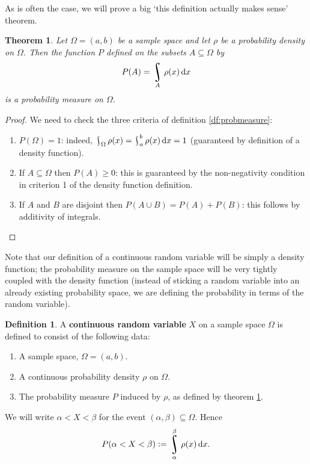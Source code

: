 \documentclass[a4paper,leqno]{article}
\DeclareMathOperator*{\rint}{\scalerel*{\rotatebox{17}{$\!\int\!$}}{\int}}
\numberwithin{equation}{section}
\newtheorem{thm}[equation]{Theorem}
\theoremstyle{definition}
\newtheorem{defn}[equation]{Definition}
\theoremstyle{remark}
\newcommand{\df}{\textbf}
\newcommand{\union}{\cup}
\begin{document}
As is often the case, we will prove a big `this definition actually makes sense' theorem.

\begin{thm}\label{thm:inducedprobability}
  Let $ \Omega = (a,b) $ be a sample space and let $ \rho $ be a probability density on $ \Omega $. Then
  the function $ P $ defined on the subsets $ A \subseteq \Omega $ by
  \begin{displaymath}
    P(A) = \rint_A \rho(x) \dif{x}
  \end{displaymath}
  is a probability measure on $ \Omega $.
\end{thm}
\begin{proof}
  We need to check the three criteria of definition \ref{df:probmeasure}:
  \begin{enumerate}
    \item $ P(\Omega) = 1 $: indeed, $ \rint_\Omega \rho(x) = \rint_a^b \rho(x) \dif{x} = 1 $ (guaranteed by definition of a density function).
    \item If $ A \subseteq \Omega $ then $ P(A) \geq 0 $: this is guaranteed by the non-negativity condition in criterion 1 of the density function
          definition.
    \item If $ A $ and $ B $ are disjoint then $ P(A \union B) = P(A) + P(B) $: this follows by additivity of integrals.
  \end{enumerate}
\end{proof}

Note that our definition of a continuous random variable will be simply a density function; the probability measure on the sample
space will be very tightly coupled with the density function (instead of sticking a random variable into an already existing probability
space, we are defining the probability in terms of the random variable).

\begin{defn}
  A \df{continuous random variable} $ X $ on a sample space $ \Omega $ is defined to consist of the following data:
  \begin{enumerate}
    \item A sample space, $ \Omega = (a,b) $.
    \item A continuous probability density $ \rho $ on $ \Omega $.
    \item The probability measure $ P $ induced by $ \rho $, as defined by theorem \ref{thm:inducedprobability}.
  \end{enumerate}

  We will write $ \alpha < X < \beta $ for the event $ (\alpha, \beta) \subseteq \Omega $. Hence
  \begin{displaymath}
    P(\alpha < X < \beta) := \rint_\alpha^\beta \rho(x) \dif{x}.
  \end{displaymath}
\end{defn}
\end{document}
